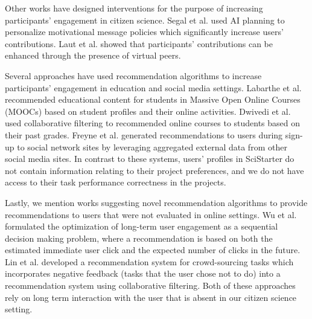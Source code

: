 \documentclass[letterpaper]{article} %
\begin{document}
Other works have designed interventions for the purpose of  increasing  participants' engagement in citizen science.
Segal et al.   used AI planning to  personalize  motivational message
policies which significantly increase users’ contributions.
Laut et al.   showed that participants’ contributions can be enhanced through the presence of virtual peers.



Several approaches have used recommendation algorithms to increase participants'  engagement   in education and social media settings. Labarthe et al.  recommended educational content
for students in Massive Open Online Courses (MOOCs)   based on student profiles and their online activities.    Dwivedi et al.  used collaborative filtering to  recommended  online courses to students based on their past grades.  Freyne et al.  generated  recommendations to users during sign-up
to social network sites by leveraging aggregated external data from other
social media sites.
In contrast to these systems, users' profiles in SciStarter do not contain
information relating to their project  preferences, and we do not have access to their
task performance correctness in the projects.

Lastly, we mention works suggesting novel recommendation algorithms to provide
recommendations to users that were not evaluated in online settings.
Wu et al.   formulated the optimization of long-term user engagement as a sequential decision making problem, where a recommendation is based on both the estimated immediate user click and the expected number of clicks  in the future.
Lin et al.  developed a recommendation system for crowd-sourcing tasks which incorporates negative   feedback (tasks that the user chose not to do) into a recommendation system using collaborative filtering.  Both of these approaches
rely on long term interaction with the user that is absent in our citizen science setting.
\end{document}
